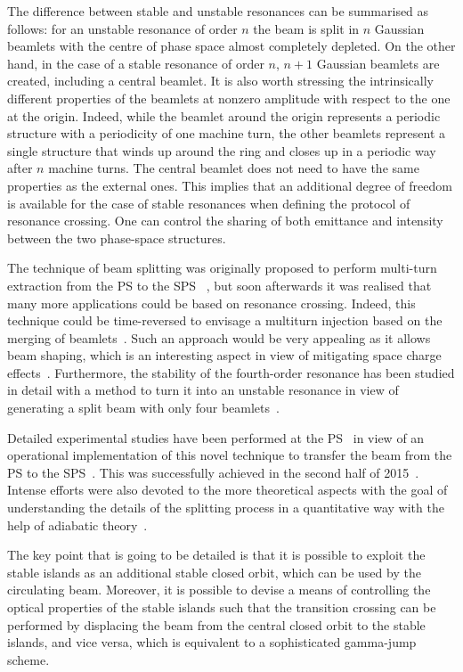 \documentclass{article}
\begin{document}
The difference between stable and unstable resonances can be summarised as follows: for an unstable resonance of order $n$ the beam is split in $n$ Gaussian beamlets with the centre of phase space almost completely depleted. On the other hand, in the case of a stable resonance of order $n$, $n+1$ Gaussian beamlets are created, including a central beamlet. It is also worth stressing the intrinsically different properties of the beamlets at nonzero amplitude with respect to the one at the origin. Indeed, while the beamlet around the origin represents a periodic structure with a periodicity of one machine turn, the other beamlets represent a single structure that winds up around the ring and closes up in a periodic way after $n$ machine turns. The central beamlet does not need to have the same properties as the external ones. This implies that an additional degree of freedom is available for the case of stable resonances when defining the protocol of resonance crossing. One can control the sharing of both emittance and intensity between the two phase-space structures. 

The technique of beam splitting was originally proposed to perform multi-turn extraction from the PS to the SPS ~\cite{prl,epac,MTE2,MTE2a,MTEDR}, but soon afterwards it was realised that many more applications could be based on resonance crossing. Indeed, this technique could be time-reversed to envisage a multiturn injection based on the merging of beamlets~\cite{MTI-PRSTAB}. Such an approach would be very appealing as it allows beam shaping, which is an interesting aspect in view of mitigating space charge effects~\cite{MTI-ipac}. Furthermore, the stability of the fourth-order resonance has been studied in detail with a method to turn it into an unstable resonance in view of generating a split beam with only four beamlets~\cite{diego}. 

Detailed experimental studies have been performed at the PS~\cite{MTE-prog} in view of an operational implementation of this novel technique to transfer the beam from the PS to the SPS~\cite{MTE-comm}. This was successfully achieved in the second half of 2015~\cite{MTEEPL}. Intense efforts were also devoted to the more theoretical aspects with the goal of understanding the details of the splitting process in a quantitative way with the help of adiabatic theory~\cite{adiab}. 

The key point that is going to be detailed is that it is possible to exploit the stable islands as an additional stable closed orbit, which can be used by the circulating beam. Moreover, it is possible to devise a means of controlling the optical properties of the stable islands such that the transition crossing can be performed by displacing the beam from the central closed orbit to the stable islands, and vice versa, which is equivalent to a sophisticated gamma-jump scheme.
\end{document}
